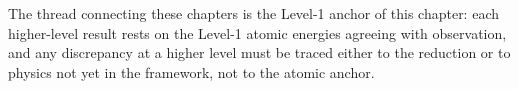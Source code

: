 The thread connecting these chapters is the Level-1 anchor of this chapter: each higher-level result rests on the Level-1 atomic energies agreeing with observation, and any discrepancy at a higher level must be traced either to the reduction or to physics not yet in the framework, not to the atomic anchor.

